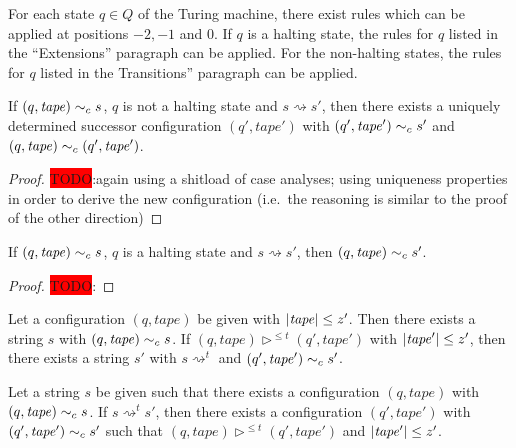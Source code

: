 \documentclass[a4paper,UKenglish,cleveref, autoref]{lipics-v2019}
\newcommand{\TODO}[1]{\colorbox{red}{\LARGE TODO}:#1}
\newcommand{\strent}{\rightsquigarrow}
\begin{document}
\begin{lemma}
  For each state $q \in Q$ of the Turing machine, there exist rules which can be applied at positions $-2, -1$ and $0$. If $q$ is a halting state, the rules for $q$ listed in the ``Extensions'' paragraph can be applied. For the non-halting states, the rules for $q$ listed in the Transitions'' paragraph can be applied.
\end{lemma}

\begin{lemma}
  If $(q, \mathit{tape}) \sim_c{} s$, $q$ is not a halting state and $s \strent{} s'$, then there exists a uniquely determined successor configuration $(q', \mathit{tape}')$ with $(q', \mathit{tape}') \sim_c{} s'$ and $(q, \mathit{tape}) \sim_c (q', \mathit{tape}')$. 
\end{lemma}
\begin{proof}
  \TODO{again using a shitload of case analyses; using uniqueness properties in order to derive the new configuration (i.e.\ the reasoning is similar to the proof of the other direction)}
\end{proof}

\begin{lemma}
  If $(q, \mathit{tape}) \sim_c{} s$, $q$ is a halting state and $s \strent{} s'$, then $(q, \mathit{tape}) \sim_c{} s'$. 
\end{lemma}
\begin{proof}
  \TODO{}
\end{proof}

\begin{theorem}[Completeness]
  Let a configuration $(q, \mathit{tape})$ be given with $|\mathit{tape}| \le z'$. Then there exists a string $s$ with $(q, \mathit{tape}) \sim_c{} s$. If $(q, \mathit{tape}) \rhd^{\le t} (q', \mathit{tape}')$ with $|\mathit{tape}'| \le z'$, then there exists a string $s'$ with $s \strent^t$ and $(q', \mathit{tape}') \sim_c{} s'$.  
\end{theorem}

\begin{theorem}[Soundness]
  Let a string $s$ be given such that there exists a configuration $(q, \mathit{tape})$ with $(q, \mathit{tape}) \sim_c{} s$. If $s \strent^t s'$, then there exists a configuration $(q', \mathit{tape}')$ with $(q', \mathit{tape}') \sim_c{} s'$ such that $(q, \mathit{tape}) \rhd^{\le t} (q', \mathit{tape}')$ and $|\mathit{tape}'| \le z'$. 
\end{theorem}
\end{document}
